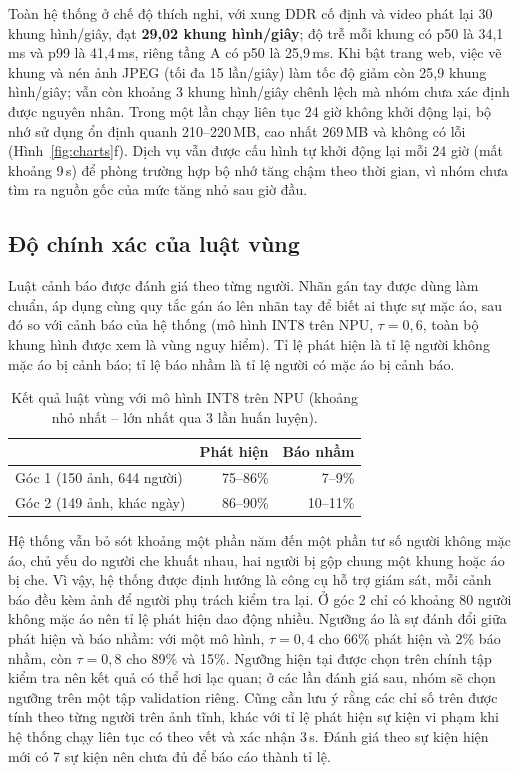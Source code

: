 \documentclass[11pt,a4paper,twocolumn]{article}
\begin{document}
Toàn hệ thống ở chế độ thích nghi, với xung DDR cố định và video phát lại 30 khung hình/giây, đạt \textbf{29,02 khung hình/giây}; độ trễ mỗi khung có p50 là 34,1\,ms và p99 là 41,4\,ms,
riêng tầng A có p50 là 25,9\,ms. Khi bật trang web, việc vẽ khung và nén ảnh JPEG (tối đa 15 lần/giây) làm tốc độ giảm còn 25,9 khung hình/giây; vẫn còn khoảng 3 khung hình/giây chênh lệch mà nhóm
chưa xác định được nguyên nhân. Trong một lần chạy liên tục 24 giờ không khởi động lại, bộ nhớ sử dụng ổn định quanh 210--220\,MB, cao nhất 269\,MB và không có lỗi (Hình~\ref{fig:charts}f).
Dịch vụ vẫn được cấu hình tự khởi động lại mỗi 24 giờ (mất khoảng 9\,s) để phòng trường hợp bộ nhớ tăng chậm theo thời gian, vì nhóm chưa tìm ra nguồn gốc của mức tăng nhỏ sau giờ đầu.

\subsection{Độ chính xác của luật vùng}

Luật cảnh báo được đánh giá theo từng người. Nhãn gán tay được dùng làm chuẩn, áp dụng cùng quy tắc gán áo lên nhãn tay để biết ai thực sự mặc áo, sau đó so với cảnh báo của hệ thống
(mô hình INT8 trên NPU, $\tau=0{,}6$, toàn bộ khung hình được xem là vùng nguy hiểm). Tỉ lệ phát hiện là tỉ lệ người không mặc áo bị cảnh báo; tỉ lệ báo nhầm là tỉ lệ người có mặc áo bị cảnh báo.

\begin{table}[t]
\centering
\caption{Kết quả luật vùng với mô hình INT8 trên NPU (khoảng nhỏ nhất -- lớn nhất qua 3 lần huấn luyện).}
\label{tab:zone}
\footnotesize
\begin{tabular}{@{}lrr@{}}
\toprule
 & Phát hiện & Báo nhầm \\
\midrule
Góc 1 (150 ảnh, 644 người) & 75--86\% & 7--9\% \\
Góc 2 (149 ảnh, khác ngày) & 86--90\% & 10--11\% \\
\bottomrule
\end{tabular}
\end{table}

Hệ thống vẫn bỏ sót khoảng một phần năm đến một phần tư số người không mặc áo, chủ yếu do người che khuất nhau, hai người bị gộp chung một khung hoặc áo bị che. Vì vậy, hệ thống được
định hướng là công cụ hỗ trợ giám sát, mỗi cảnh báo đều kèm ảnh để người phụ trách kiểm tra lại. Ở góc 2 chỉ có khoảng 80 người không mặc áo nên tỉ lệ phát hiện dao động nhiều. Ngưỡng áo là
sự đánh đổi giữa phát hiện và báo nhầm: với một mô hình, $\tau=0{,}4$ cho 66\% phát hiện và 2\% báo nhầm, còn $\tau=0{,}8$ cho 89\% và 15\%. Ngưỡng hiện tại được chọn trên chính tập kiểm tra nên
kết quả có thể hơi lạc quan; ở các lần đánh giá sau, nhóm sẽ chọn ngưỡng trên một tập validation riêng. Cũng cần lưu ý rằng các chỉ số trên được tính theo từng người trên ảnh tĩnh, khác với
tỉ lệ phát hiện sự kiện vi phạm khi hệ thống chạy liên tục có theo vết và xác nhận 3\,s. Đánh giá theo sự kiện hiện mới có 7 sự kiện nên chưa đủ để báo cáo thành tỉ lệ.
\end{document}
